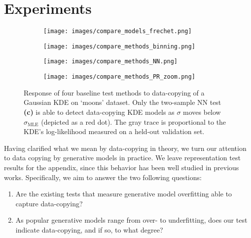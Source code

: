 \section{Experiments}
\label{sec:experiments}
\begin{figure*}
    \centering
    \begin{subfigure}{.24\linewidth}
        \centering
        \texttt{[image: images/compare\_models\_frechet.png]}
        \caption{}\label{fig:moons frechet}
    \end{subfigure}
    \begin{subfigure}{0.24\linewidth}
        \centering
        \texttt{[image: images/compare\_methods\_binning.png]}
        \caption{}\label{fig:moons binning}
    \end{subfigure}
    \begin{subfigure}{.24\linewidth}
        \centering
        \texttt{[image: images/compare\_methods\_NN.png]}
        \caption{}\label{fig:moons NN compare}
    \end{subfigure}
    \begin{subfigure}{0.24\linewidth}
        \centering
        \texttt{[image: images/compare\_methods\_PR\_zoom.png]}
        \caption{}\label{fig:moons PR}
    \end{subfigure}
    \caption{Response of four baseline test methods to data-copying of a Gaussian KDE on `moons' dataset. Only the two-sample NN test \textbf{(c)} is able to detect data-copying KDE models as $\sigma$ moves below $\sigma_{\text{MLE}}$ (depicted as a red dot). The gray trace is proportional to the KDE's log-likelihood measured on a held-out validation set.}
    \label{fig:compare methods}
\end{figure*} 

Having clarified what we mean by data-copying in theory, we turn our attention to data copying by generative models in practice. We leave representation test results for the appendix, since this behavior has been well studied in previous works. Specifically, we aim to answer the two following questions:
\begin{enumerate}
    \item  Are the existing tests that measure generative model overfitting able to capture data-copying? 
    \item As popular generative models range from over- to underfitting, does our test indicate data-copying, and if so, to what degree? 
\end{enumerate}

